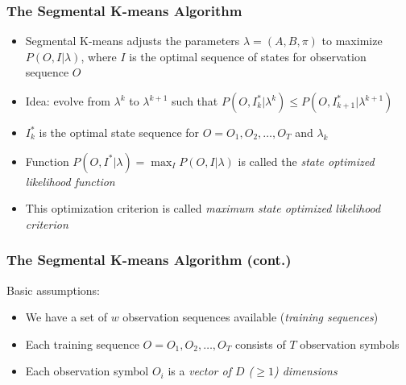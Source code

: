 \documentclass{beamer}
\begin{document}




\begin{frame} \frametitle{The Segmental K-means Algorithm}

  \begin{itemize}
  \item Segmental K-means adjusts the parameters $\lambda = (A, B, \pi)$ to
    maximize $P(O,I|\lambda)$, where $I$ is the optimal sequence of states for
    observation sequence $O$
  \item Idea: evolve from $\lambda^k$ to $\lambda^{k+1}$ such that
    $P(O,I^*_k|\lambda^k) \leq P(O,I^*_{k+1}|\lambda^{k+1})$
  \item $I^*_k$ is the optimal state sequence for $O = O_1, O_2, \dotsc, O_T$
    and $\lambda_k$
  \item Function $P(O,I^*|\lambda) = \max_I P(O,I|\lambda)$ is called the
    \emph{state optimized likelihood function}
  \item This optimization criterion is called \emph{maximum state optimized
      likelihood criterion}
  \end{itemize}
  
\end{frame}


\begin{frame} \frametitle{The Segmental K-means Algorithm (cont.)}

  Basic assumptions:
  \begin{itemize}
  \item We have a set of $w$ observation sequences available (\emph{training
      sequences})
  \item Each training sequence $O = O_1, O_2, \dotsc, O_T$ consists of $T$
    observation symbols
  \item Each observation symbol $O_i$ is a \emph{vector of $D$ ($\geq 1$) dimensions}
  \end{itemize}
  
\end{frame}

\end{document}
